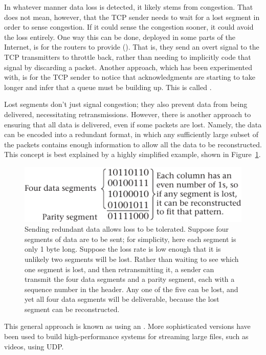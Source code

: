 In whatever manner data loss is detected, it likely stems from congestion.  That
does not mean, however, that the TCP sender needs to wait for a lost
segment in order to sense congestion.  If it could sense the
congestion sooner, it could avoid the loss entirely.  One way
this can be done, deployed in some parts of the Internet, is for the
routers to provide 
().  That is, they send an overt signal to the TCP
transmitters to throttle back, rather than needing to implicitly code
that signal by discarding a packet.  Another approach, which has been
experimented with, is for the TCP sender to notice that
acknowledgments are starting to take longer and infer that a queue
must be building up.  This is called .

Lost segments don't just signal congestion; they also prevent data
from being delivered, necessitating retransmissions.  However, there
is another approach to ensuring that all data is delivered, even if
some packets are lost. Namely, the data can be encoded into a
redundant format, in which any sufficiently large subset of the
packets contains enough information to allow all the data to be
reconstructed.  This concept is best explained by a highly
simplified example, shown in Figure~\ref{scan-9-6}.
\begin{figure}
\centerline{\includegraphics{hail_f0909}}
\caption{Sending redundant data allows loss to be tolerated.  Suppose four
  segments of data are to be sent; for simplicity, here each segment
  is only 1 byte long.  Suppose the loss rate is low enough that it is
  unlikely two segments will be lost.  Rather than waiting to see
  which one segment is lost, and then retransmitting it, a sender can
  transmit the four data segments and a parity segment,
  each with a sequence number in the header.  Any one of the five can
  be lost, and yet all four data segments will be deliverable, because
  the lost segment can be reconstructed.}
\label{scan-9-6}
\end{figure}
This general approach is known as  using an .  More sophisticated
versions have been used to build high-performance systems for streaming
large files, such as videos, using UDP.

